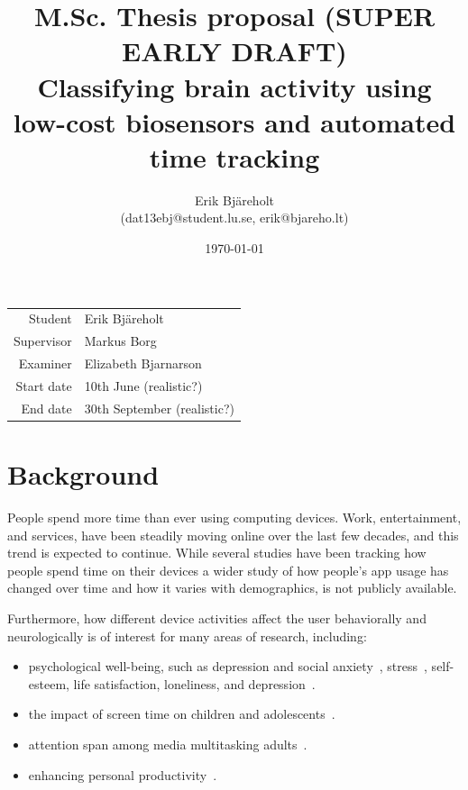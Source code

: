 \documentclass{IEEEtran}
\title{%
    \large M.Sc. Thesis proposal (SUPER EARLY DRAFT)\\
    \huge Classifying brain activity using low-cost biosensors and automated time tracking \\}
\author{Erik Bjäreholt \\(dat13ebj@student.lu.se, erik@bjareho.lt)}
\date{\today}
\begin{document}
\maketitle

\begin{center}
\begin{tabular}{r l}
 Student & Erik Bjäreholt \\
 Supervisor & Markus Borg \\
 Examiner & Elizabeth Bjarnarson \\
 Start date & 10th June (realistic?) \\
 End date & 30th September (realistic?) \\
\end{tabular}
\end{center}

\tableofcontents


\section{Background}

People spend more time than ever using computing devices. Work, entertainment, and services, have been steadily moving online over the last few decades, and this trend is expected to continue. While several studies have been tracking how people spend time on their devices a wider study of how people's app usage has changed over time and how it varies with demographics, is not publicly available.

Furthermore, how different device activities affect the user behaviorally and neurologically is of interest for many areas of research, including:

\begin{itemize}
    \item psychological well-being, such as depression and social anxiety~\cite{selfhout_different_2009}\cite{shah_nonrecursive_2002}, stress~\cite{mark_stress_2014}, self-esteem, life satisfaction, loneliness, and depression~\cite{huang_time_2017}.
    \item the impact of screen time on children and adolescents~\cite{subrahmanyam_impact_2001}.
    \item attention span among media multitasking adults~\cite{mark_stress_2014}.
    \item enhancing personal productivity~\cite{kim_timeaware_2016}.
\end{itemize}
\end{document}
